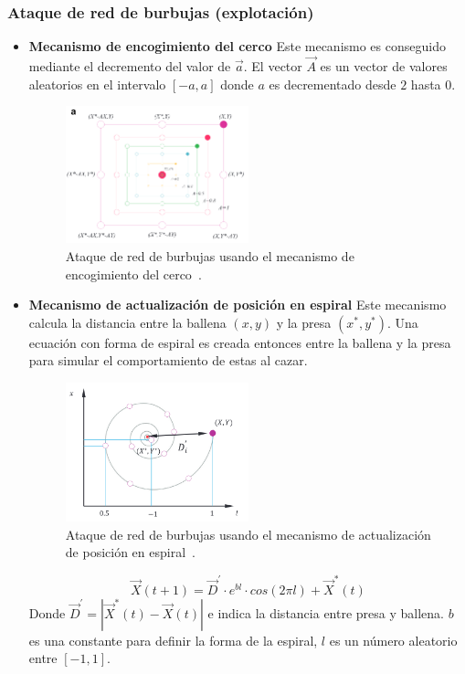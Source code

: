 \subsubsection{Ataque de red de burbujas (explotación)}
\begin{itemize}
    \item \textbf{Mecanismo de encogimiento del cerco}
          Este mecanismo es conseguido mediante el decremento del valor de $\vec{a}$. El vector $\vec{A}$ es un vector de valores aleatorios en el intervalo $[-a,a]$ donde $a$ es decrementado desde $2$ hasta $0$.
          \begin{figure}[H]
              \centering
              \includegraphics[width=0.5\textwidth]{imagenes/wao-shrinking-circle-prey-mechanism.png}
              \caption[Mecanismo de encogimiento del cerco]{Ataque de red de burbujas usando el mecanismo de encogimiento del cerco~\cite{mirjalili_whale_2016}.}
          \end{figure}

    \item \textbf{Mecanismo de actualización de posición en espiral}
          Este mecanismo calcula la distancia entre la ballena $(x,y)$ y la presa $(x^*, y^*)$. Una ecuación con forma de espiral es creada entonces entre la ballena y la presa para simular el comportamiento de estas al cazar.
          \begin{figure}[H]
              \centering
              \includegraphics[width=0.5\textwidth]{imagenes/spiral-update-position-wao.png}
              \caption[Mecanismo de actualización de posición en espiral]{Ataque de red de burbujas usando el mecanismo de actualización de posición en espiral~\cite{mirjalili_whale_2016}.}
          \end{figure}

          \begin{equation}
              \vec{X}(t+1)=\vec{D}^{'}\cdot e^{bl}\cdot cos(2\pi l)+\vec{X}^*(t)
          \end{equation}
          Donde $\vec{D}^{'}=|\vec{X}^*(t)-\vec{X}(t)|$ e indica la distancia entre presa y ballena. $b$ es una constante para definir la forma de la espiral, $l$ es un número aleatorio entre $[-1,1]$.
\end{itemize}


